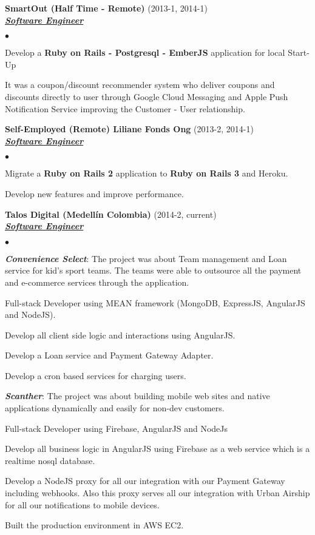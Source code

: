 \documentclass[a4paper]{article}
\newcommand{\employer}[3]{{
\textbf{#1} (#2)\\ \underline{\textbf{\emph{#3}}}\\ }}
\newenvironment{achievements}{\begin{list}{$\bullet$}{\topsep 0pt \itemsep
-2pt}}{\vspace*{4pt}\end{list}}
\newcommand{\programming}[1]{{\textbf{#1}}}
\newcommand{\emphasys}[1]{\textbf{\emph{#1}}}
\begin{document}
\employer{ SmartOut (Half Time - Remote)}{2013-1, 2014-1}{Software Engineer}
\begin{achievements}
\item Develop a \programming{Ruby on Rails - Postgresql - EmberJS} application for local Start-Up
\item It was a coupon/discount recommender system who deliver coupons and discounts directly to user through Google Cloud Messaging and Apple Push Notification Service improving the Customer - User relationship.
\end{achievements}

\employer{ Self-Employed (Remote)  Liliane Fonds Ong}{2013-2, 2014-1}{Software Engineer}
\begin{achievements}
\item Migrate a \programming{Ruby on Rails 2} application to \programming{Ruby on Rails 3} and Heroku.
\item Develop new features and improve performance.
\end{achievements}

\employer{ Talos Digital (Medell\'in Colombia)}{2014-2, current}{Software Engineer}
\begin{achievements}
\item \emphasys{Convenience Select}: The project was about Team management and Loan service for kid's sport teams. The teams were able to outsource all the payment and e-commerce services through the application.
\item Full-stack Developer using MEAN framework  (MongoDB, ExpressJS, AngularJS and NodeJS).
\item Develop all client side logic and interactions using AngularJS.
\item Develop a Loan service and Payment Gateway Adapter.
\item Develop a cron based services for charging users.
\item \emphasys{Scanther}: The project was about building mobile web sites and native applications dynamically and easily for non-dev customers.
\item Full-stack Developer using Firebase, AngularJS and NodeJs
\item Develop all business logic in AngularJS using Firebase as a web service which is a realtime nosql database.
\item Develop a NodeJS proxy for all our integration with our Payment Gateway including webhooks. Also this proxy serves all our integration with Urban Airship for all our notifications to mobile devices.
\item Built the production environment in AWS EC2.
\end{achievements}
\end{document}

